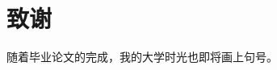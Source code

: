 \cleardoublepage
\pagestyle{mainstyle}

\section*{致\quad 谢}


随着毕业论文的完成，我的大学时光也即将画上句号。



\vspace{2em}
\clearpage          %
